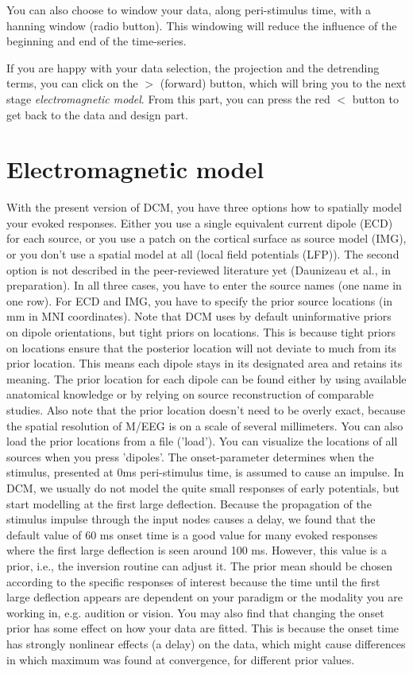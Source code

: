 You can also choose to window your data, along peri-stimulus time,
with a hanning window (radio button). This windowing will reduce the
influence of the beginning and end of the time-series. 

If you are happy with your data selection, the projection and the detrending
terms, you can click on the $>$ (forward) button, which will bring you to
the next stage \textit{electromagnetic model}. From this part, you can
press the red $<$ button to get back to the data and design part.

\section{Electromagnetic model}
With the present version of DCM, you have three options how to spatially
model your evoked responses. Either you use a single equivalent
current dipole (ECD) for each source, or you use a patch on the
cortical surface as source model (IMG), or you don't use a spatial model at all (local field potentials (LFP)). The second option is not
described in the peer-reviewed literature yet (Daunizeau et al., in
preparation). In all three cases, you have to enter the source names (one
name in one row). For ECD and IMG, you have to specify the prior source locations (in mm in MNI
coordinates). Note that DCM uses by default uninformative priors on  
dipole orientations, but tight priors on locations. This is because tight priors on locations ensure that the posterior location will not deviate to much from its prior location. This means each dipole stays in its designated area and retains its meaning. The prior location for each
dipole can be found either by using available anatomical knowledge or
by relying on source reconstruction of comparable studies. Also note
that the prior location doesn't need to be overly exact, because the
spatial resolution of M/EEG is on a scale of several millimeters. 
You can also load the prior locations from a file
('load'). You can visualize the locations of all sources when you
press 'dipoles'. The onset-parameter determines when the stimulus,
presented at 0ms peri-stimulus time, is assumed to cause an
impulse. In DCM, we usually do not model the quite small responses of
early potentials, but start modelling at the first large
deflection. Because the propagation of the stimulus impulse through
the input nodes causes a delay, we found that the default value of 60
ms onset time is a good value for many evoked responses where the
first large deflection is seen around 100 ms. However, this value is a
prior, i.e., the inversion routine can adjust it. The prior mean should be chosen according to the specific responses of interest because the time until the first large deflection appears are dependent on your paradigm or the modality you are working in, e.g. audition or vision. 
You may also find that changing the onset prior has some effect on how your data are
fitted. This is because the onset time has strongly nonlinear effects
(a delay) on the data, which might cause differences in which maximum
was found at convergence, for different prior values. 

